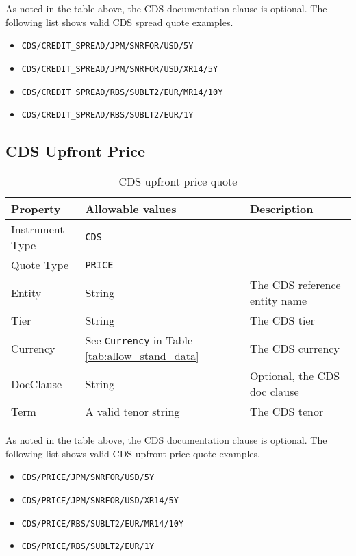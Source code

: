 As noted in the table above, the CDS documentation clause is optional. The following list shows valid CDS spread quote examples.
\begin{itemize}
\item \lstinline!CDS/CREDIT_SPREAD/JPM/SNRFOR/USD/5Y!
\item \lstinline!CDS/CREDIT_SPREAD/JPM/SNRFOR/USD/XR14/5Y!
\item \lstinline!CDS/CREDIT_SPREAD/RBS/SUBLT2/EUR/MR14/10Y!
\item \lstinline!CDS/CREDIT_SPREAD/RBS/SUBLT2/EUR/1Y!
\end{itemize}

\subsection{CDS Upfront Price}
\label{md:cds_price_quote}

\begin{table}[H]
\centering
  \begin{tabular}{|p{3cm}|p{3.5cm}|p{7cm}|}
    \hline
    {\bf Property} & {\bf Allowable values} & {\bf Description} \\ \hline
    Instrument Type & \lstinline!CDS! & \\ \hline
    Quote Type & \lstinline!PRICE! & \\ \hline
    Entity & String & The CDS reference entity name \\ \hline
    Tier & String & The CDS tier \\ \hline
    Currency & See \lstinline!Currency! in Table \ref{tab:allow_stand_data} & The CDS currency\\ \hline
    DocClause & String & Optional, the CDS doc clause \\ \hline
    Term & A valid tenor string & The CDS tenor\\ \hline
  \end{tabular}
  \caption{CDS upfront price quote}
  \label{tab:cds_price_quote}
\end{table}

As noted in the table above, the CDS documentation clause is optional. The following list shows valid CDS upfront price quote examples.
\begin{itemize}
\item \lstinline!CDS/PRICE/JPM/SNRFOR/USD/5Y!
\item \lstinline!CDS/PRICE/JPM/SNRFOR/USD/XR14/5Y!
\item \lstinline!CDS/PRICE/RBS/SUBLT2/EUR/MR14/10Y!
\item \lstinline!CDS/PRICE/RBS/SUBLT2/EUR/1Y!
\end{itemize}

